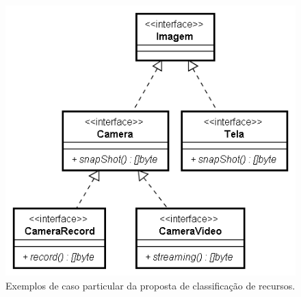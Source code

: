 \begin{figure}[ht]
	\center
	\includegraphics[scale=0.8]{imagens/diagramaRecursosProposta}
	\caption{Exemplos de caso particular da proposta de classificação de recursos.}
	\label{fig:diagramaRecursosProposta}
\end{figure}

